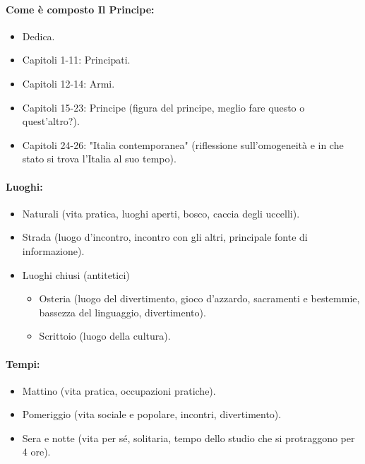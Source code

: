 \documentclass{article}
\begin{document}
\paragraph{Come è composto Il Principe:}
\begin{itemize}
    \item Dedica.
    \item Capitoli 1-11: Principati.
    \item Capitoli 12-14: Armi.
    \item Capitoli 15-23: Principe (figura del principe, meglio fare questo o quest'altro?).
    \item Capitoli 24-26: "Italia contemporanea" (riflessione sull'omogeneità e in che stato si trova l'Italia al suo tempo).
\end{itemize}

\paragraph{Luoghi:}
\begin{itemize}
    \item Naturali (vita pratica, luoghi aperti, bosco, caccia degli uccelli).
    \item Strada (luogo d'incontro, incontro con gli altri, principale fonte di informazione).
    \item Luoghi chiusi (antitetici)
    \begin{itemize}
        \item Osteria (luogo del divertimento, gioco d'azzardo, sacramenti e bestemmie, bassezza del linguaggio, divertimento).
        \item Scrittoio (luogo della cultura).
    \end{itemize}
\end{itemize}

\paragraph{Tempi:}
\begin{itemize}
    \item Mattino (vita pratica, occupazioni pratiche).
    \item Pomeriggio (vita sociale e popolare, incontri, divertimento).
    \item Sera e notte (vita per sé, solitaria, tempo dello studio che si protraggono per 4 ore).
\end{itemize}
\end{document}
